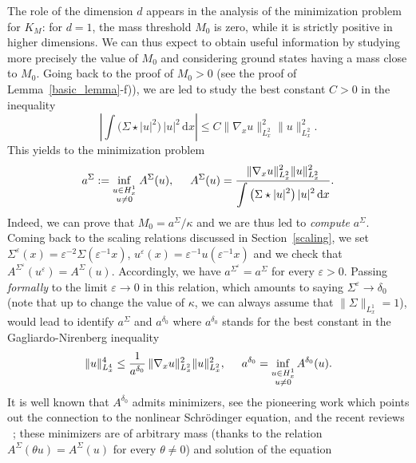 \documentclass[JEP,XML,SOM,NoEqCountersInSection,NoFloatCountersInSection,Unicode,published]{cedram}
\theoremstyle{definition}
\let\ds\displaystyle
\newcommand{\ud}{\, {\mathrm{d}}}
\begin{document}
The role of the dimension $d$ appears in the analysis of the minimization problem for $K_{M}$: for $d=1$, the mass threshold $M_0$ is zero, while it is strictly positive in higher dimensions.
We can thus expect to obtain useful information by
studying more precisely the value of $M_0$ and
considering
ground states having a mass close to $M_{0}$.
Going back to the proof of $M_{0}>0$ (see the proof of Lemma~\ref{basic_lemma}-f)), we are led to study
the best constant $C>0$ in the inequality
\[
\left|\int\big(\Sigma\star|u|^{2}\big)\,|u|^{2}\ud x\right|\leq C\|\nabla_{x}u\|_{L_{x}^{2}}^{2}\|u\|_{L_{x}^{2}}^{2}.
\]
This yields to the minimization problem\vspace*{-5pt}
\[
a^{\Sigma}:=\underset{\substack{u\in H_{x}^{1} \\ u\neq 0}}{\inf}\;A^{\Sigma}(u), \hspace{0.5cm} A^{\Sigma}(u)=\ds\frac{\ds\|\nabla_{x}u\|_{L_{x}^{2}}^{2}\|u\|_{L_{x}^{2}}^{2}}{\ds\int\big(\Sigma\star|u|^{2}\big)\,|u|^{2}\ud x}.
\]
Indeed, we can prove that $M_{0}=a^{\Sigma}/\kappa$ and we are thus led to \emph{compute} $a^{\Sigma}$.
Coming back to the scaling relations discussed in Section~\ref{scaling}, we set $\Sigma^{\varepsilon}(x)=\varepsilon^{-2}\Sigma(\varepsilon^{-1}x)$, $u^{\varepsilon}(x)=\varepsilon^{-1}u(\varepsilon^{-1}x)$ and we check that $A^{\Sigma^{\varepsilon}}(u^{\varepsilon})=A^{\Sigma}(u)$.
Accordingly, we have $a^{\Sigma^{\varepsilon}}=a^{\Sigma}$ for every $\varepsilon>0$. Passing \emph{formally} to the limit $\varepsilon\to 0$ in this relation, which amounts to saying $\Sigma^{\varepsilon}\to\delta_{0}$ (note that up to change the value of $\kappa$, we can always assume that $\|\Sigma\|_{L_{x}^{1}}=1$), would lead to identify $a^{\Sigma}$ and $a^{\delta_{0}}$ where $a^{\delta_{0}}$ stands for the best constant in the Gagliardo-Nirenberg inequality\vspace*{-3pt}
\[
\|u\|_{L_{x}^{4}}^{4}\leq \ds\frac{1}{a^{\delta_{0}}}\,\|\nabla_{x}u\|_{L_{x}^{2}}^{2}\|u\|_{L_{x}^{2}}^{2}, \hspace{0.5cm} a^{\delta_{0}}=\underset{\substack{u\in H_{x}^{1} \\ u\neq 0}}{\inf}\, A^{\delta_{0}}(u).
\]
It is well known that $A^{\delta_{0}}$ admits minimizers, see
the pioneering work \cite[Th.\,B]{weinstein1982} which points out the connection to the nonlinear Schrödinger equation,
and the recent reviews \cite{Bol, DPD}~; these minimizers are of arbitrary mass (thanks to the relation $A^{\Sigma}(\theta u)=A^{\Sigma}(u)$ for every $\theta\neq 0$) and solution of the equation\vspace*{-3pt}
\end{document}

